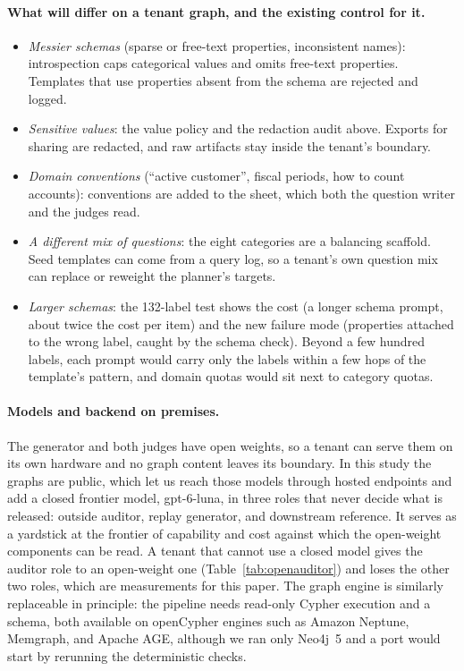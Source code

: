 \paragraph{What will differ on a tenant graph, and the existing control for it.}
\begin{itemize}
\item \emph{Messier schemas} (sparse or free-text properties, inconsistent names): introspection caps categorical values and omits free-text properties. Templates that use properties absent from the schema are rejected and logged.
\item \emph{Sensitive values}: the value policy and the redaction audit above. Exports for sharing are redacted, and raw artifacts stay inside the tenant's boundary.
\item \emph{Domain conventions} (``active customer'', fiscal periods, how to count accounts): conventions are added to the sheet, which both the question writer and the judges read.
\item \emph{A different mix of questions}: the eight categories are a balancing scaffold. Seed templates can come from a query log, so a tenant's own question mix can replace or reweight the planner's targets.
\item \emph{Larger schemas}: the 132-label test shows the cost (a longer schema prompt, about twice the cost per item) and the new failure mode (properties attached to the wrong label, caught by the schema check). Beyond a few hundred labels, each prompt would carry only the labels within a few hops of the template's pattern, and domain quotas would sit next to category quotas.
\end{itemize}

\paragraph{Models and backend on premises.} The generator and both judges have open weights, so a tenant can serve them on its own hardware and no graph content leaves its boundary. In this study the graphs are public, which let us reach those models through hosted endpoints and add a closed frontier model, gpt-6-luna, in three roles that never decide what is released: outside auditor, replay generator, and downstream reference. It serves as a yardstick at the frontier of capability and cost against which the open-weight components can be read. A tenant that cannot use a closed model gives the auditor role to an open-weight one (Table~\ref{tab:openauditor}) and loses the other two roles, which are measurements for this paper. The graph engine is similarly replaceable in principle: the pipeline needs read-only Cypher execution and a schema, both available on openCypher engines such as Amazon Neptune, Memgraph, and Apache AGE, although we ran only Neo4j~5 and a port would start by rerunning the deterministic checks.

